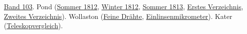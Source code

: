 \href{https://archive.org/details/philosophicaltra103royauoft}{Band 103}.
Pond (\href{https://doi.org/10.1098/rstl.1813.0006}{Sommer 1812}, \href{https://doi.org/10.1098/rstl.1813.0020}{Winter 1812}, \href{https://upload.wikimedia.org/wikipedia/commons/e/ed/Philosophical_transactions._v._1-177%2C_1665-66-1886_%28IA_philosophicaltra103royauoft%29.pdf#page=364}{Sommer 1813}, \href{https://doi.org/10.1098/rstl.1813.0011}{Erstes Verzeichnis}, \href{https://doi.org/10.1098/rstl.1813.0035}{Zweites Verzeichnis}).
Wollaston (\href{https://doi.org/10.1098/rstl.1813.0018}{Feine Drähte}, \href{https://doi.org/10.1098/rstl.1813.0019}{Einlinsenmikrometer}).
Kater (\href{https://doi.org/10.1098/rstl.1813.0028}{Teleskopvergleich}).

\clearpage
